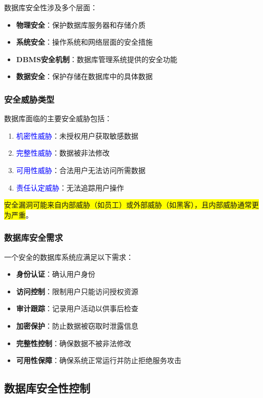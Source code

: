 \documentclass{../../note}
\begin{document}
数据库安全性涉及多个层面：
\begin{itemize}
    \item \textbf{物理安全}：保护数据库服务器和存储介质
    \item \textbf{系统安全}：操作系统和网络层面的安全措施
    \item \textbf{DBMS安全机制}：数据库管理系统提供的安全功能
    \item \textbf{数据安全}：保护存储在数据库中的具体数据
\end{itemize}

\subsubsection{安全威胁类型}
数据库面临的主要安全威胁包括：

\begin{enumerate}
    \item \textcolor{blue}{机密性威胁}：未授权用户获取敏感数据
    \item \textcolor{blue}{完整性威胁}：数据被非法修改
    \item \textcolor{blue}{可用性威胁}：合法用户无法访问所需数据
    \item \textcolor{blue}{责任认定威胁}：无法追踪用户操作
\end{enumerate}

\colorbox{yellow}{安全漏洞可能来自内部威胁（如员工）或外部威胁（如黑客），且内部威胁通常更为严重}。

\subsubsection{数据库安全需求}
一个安全的数据库系统应满足以下需求：

\begin{itemize}
    \item \textbf{身份认证}：确认用户身份
    \item \textbf{访问控制}：限制用户只能访问授权资源
    \item \textbf{审计跟踪}：记录用户活动以供事后检查
    \item \textbf{加密保护}：防止数据被窃取时泄露信息
    \item \textbf{完整性控制}：确保数据不被非法修改
    \item \textbf{可用性保障}：确保系统正常运行并防止拒绝服务攻击
\end{itemize}

\subsection{数据库安全性控制}
\end{document}
